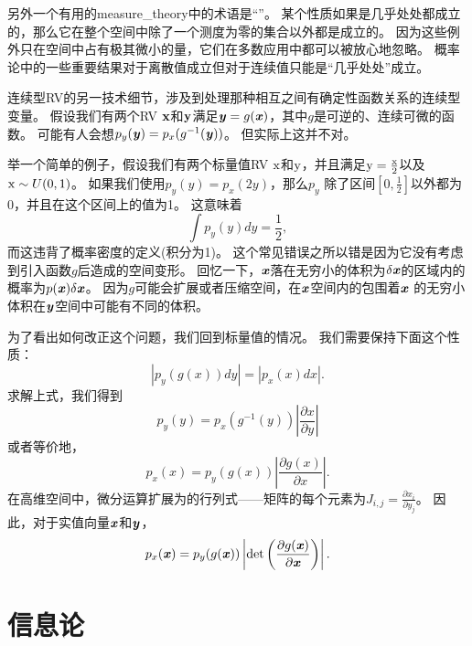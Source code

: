 另外一个有用的\gls{measure_theory}中的术语是``''。
某个性质如果是几乎处处都成立的，那么它在整个空间中除了一个测度为零的集合以外都是成立的。
因为这些例外只在空间中占有极其微小的量，它们在多数应用中都可以被放心地忽略。
概率论中的一些重要结果对于离散值成立但对于连续值只能是``几乎处处''成立。

连续型\gls{RV}的另一技术细节，涉及到处理那种相互之间有确定性函数关系的连续型变量。
假设我们有两个\gls{RV} $\mathbf{x}$和$\mathbf{y}$满足$\boldsymbol{\mathit{y}} = g(\boldsymbol{\mathit{x}})$，其中$g$是可逆的、连续可微的函数。
可能有人会想$p_y(\boldsymbol{\mathit{y}}) = p_x(g^{-1}(\boldsymbol{\mathit{y}}))$。
但实际上这并不对。

举一个简单的例子，假设我们有两个标量值\gls{RV} $\mathrm{x}$和$\mathrm{y}$，并且满足$\mathrm{y}= \frac{\mathrm{x}}{2}$以及$\mathrm{x} \sim U(0, 1)$。
如果我们使用$p_y(y) = p_x(2y)$，那么$p_y$ 除了区间$[0, \frac{1}{2}]$以外都为0，并且在这个区间上的值为1。
这意味着
\begin{equation}
\int p_y(y)dy = \frac{1}{2},
\end{equation}
而这违背了概率密度的定义(积分为1)。
这个常见错误之所以错是因为它没有考虑到引入函数$g$后造成的空间变形。
回忆一下，$\boldsymbol{\mathit{x}}$落在无穷小的体积为$\delta \boldsymbol{\mathit{x}}$的区域内的概率为$p(\boldsymbol{\mathit{x}})\delta\boldsymbol{\mathit{x}}$。
因为$g$可能会扩展或者压缩空间，在$\boldsymbol{\mathit{x}}$空间内的包围着$\boldsymbol{\mathit{x}}$ 的无穷小体积在$\boldsymbol{\mathit{y}}$空间中可能有不同的体积。


为了看出如何改正这个问题，我们回到标量值的情况。
我们需要保持下面这个性质：
\begin{equation}
|p_y(g(x))dy| = |p_x(x)dx|.
\end{equation}
求解上式，我们得到
\begin{equation}
p_y(y) = p_x(g^{-1}(y)) \left \vert \frac{\partial x}{\partial y} \right \vert
\end{equation}
或者等价地，
\begin{equation}
p_x(x) = p_y(g(x)) \left | \frac{\partial g(x)}{\partial x} \right |.
\end{equation}
在高维空间中，微分运算扩展为的行列式——矩阵的每个元素为$J_{i, j} = \frac{\partial x_i}{\partial y_j}$。
因此，对于实值向量$\boldsymbol{\mathit{x}}$和$\boldsymbol{\mathit{y}}$，
\begin{equation}
\label{eqn:3.47}
p_x(\boldsymbol{\mathit{x}}) = p_y(g(\boldsymbol{\mathit{x}})) \left | \det \left ( \frac{\partial g(\boldsymbol{\mathit{x}})}{\partial \boldsymbol{\mathit{x}}} \right) \right |.
\end{equation}

\section{信息论}
\label{sec:information_theory}

